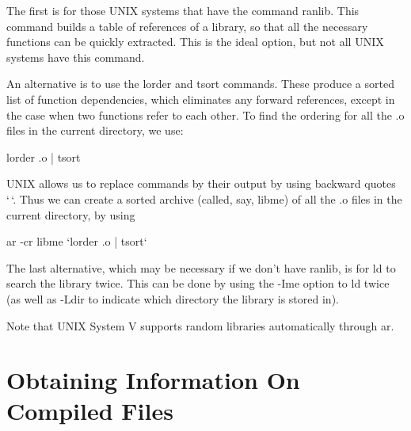      The first  is for  those UNIX  systems that have the command
{\cmd ranlib}. This command builds  a table  of references of a
library, so that all the necessary functions can be quickly
extracted. This is the ideal option, but not all UNIX systems have
this command.

     An alternative  is to  use the {\cmd lorder} and {\cmd tsort}
commands. These produce a sorted list of function dependencies, which
eliminates any forward references, except in  the case  when two
functions refer  to each  other.  To  find  the ordering for all the
{\cmd .o} files in the current directory, we use:
\begin{display}\cmd
lorder {\cd *}.o {\cd |} tsort
\end{display}
\noindent
     UNIX allows  us to  replace commands  by their  output by  using
backward quotes {\cd `\,`}.  Thus we can create a sorted archive
(called, say, {\cmd libme}) of all the
{\cmd .o} files in the current directory, by using
\begin{display}\cmd
ar -cr libme  `lorder {\cd *}.o {\cd |} tsort`
\end{display}
\noindent
     The last  alternative, which  may   be necessary  if we
don't  have {\cmd ranlib}, is  for {\cmd ld} to search the library
twice. This can be done by using the {\cmd -Ime} option to  {\cmd ld}
twice (as well as {\cmd -L}{\ms dir\/} to indicate which
directory the library is stored in).

     Note that  UNIX System  V supports random libraries automatically
through {\cmd ar}.

\section{Obtaining Information On Compiled Files}

